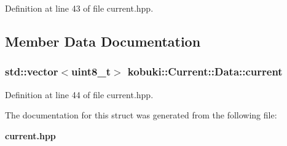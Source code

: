 \-Definition at line 43 of file current.\-hpp.



\subsection{\-Member \-Data \-Documentation}
\subsubsection[{current}]{\setlength{\rightskip}{0pt plus 5cm}std\-::vector$<$uint8\-\_\-t$>$ {\bf kobuki\-::\-Current\-::\-Data\-::current}}\label{structkobuki_1_1Current_1_1Data_ab7ee84124d14a12f12698dc7b83765ab}


\-Definition at line 44 of file current.\-hpp.



\-The documentation for this struct was generated from the following file\-:\begin{DoxyCompactItemize}
\item 
{\bf current.\-hpp}\end{DoxyCompactItemize}
